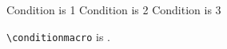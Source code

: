 \documentclass{article}
\begin{document}
\ifnum{} Condition is 1\fi
\ifnum{} Condition is 2\fi
\ifnum{} Condition is 3\fi

\verb|\conditionmacro| is \texttt{\meaning\conditionmacro}.
\end{document}
